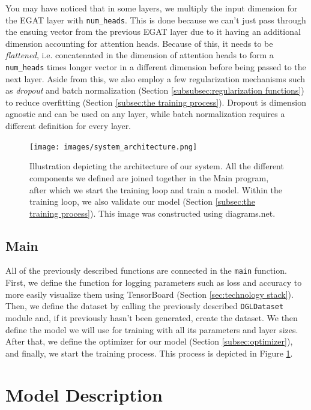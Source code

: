 \documentclass[times, utf8, diplomski, english]{fer_eng}
\begin{document}
You may have noticed that in some layers, we multiply the input dimension for the EGAT layer with \texttt{num\_heads}. This is done because we can't just pass through the ensuing vector from the previous EGAT layer due to it having an additional dimension accounting for attention heads. Because of this, it needs to be \textit{flattened}, i.e. concatenated in the dimension of attention heads to form a \texttt{num\_heads} times longer vector in a different dimension before being passed to the next layer. Aside from this, we also employ a few regularization mechanisms such as \textit{dropout} and batch normalization (Section \ref{subsubsec:regularization functions}) to reduce overfitting (Section \ref{subsec:the training process}). Dropout is dimension agnostic and can be used on any layer, while batch normalization requires a different definition for every layer.

\begin{figure}
	\centering
	\texttt{[image: images/system\_architecture.png]}
	\caption[Architecture]{Illustration depicting the architecture of our system. All the different components we defined are joined together in the Main program, after which we start the training loop and train a model. Within the training loop, we also validate our model (Section \ref{subsec:the training process}). This image was constructed using diagrams.net\footnotemark{}.}
	\label{fig:architecture}
\end{figure}

\subsection{Main}

All of the previously described functions are connected in the \texttt{main} function. First, we define the function for logging parameters such as loss and accuracy to more easily visualize them using TensorBoard (Section \ref{sec:technology stack}). Then, we define the dataset by calling the previously described \texttt{DGLDataset} module and, if it previously hasn't been generated, create the dataset. We then define the model we will use for training with all its parameters and layer sizes. After that, we define the optimizer for our model (Section \ref{subsec:optimizer}), and finally, we start the training process. This process is depicted in Figure \ref{fig:architecture}.

\section{Model Description}
\label{sec:model description}
\end{document}
